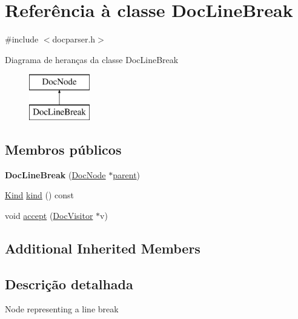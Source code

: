 \hypertarget{class_doc_line_break}{\section{Referência à classe Doc\-Line\-Break}
\label{class_doc_line_break}
}


{\ttfamily \#include $<$docparser.\-h$>$}

Diagrama de heranças da classe Doc\-Line\-Break\begin{figure}[H]
\begin{center}
\leavevmode
\includegraphics[height=2.000000cm]{class_doc_line_break}
\end{center}
\end{figure}
\subsection*{Membros públicos}
\begin{DoxyCompactItemize}
\item 
\hypertarget{class_doc_line_break_a955c43a086a27c23242f3f7e1b359037}{{\bfseries Doc\-Line\-Break} (\hyperlink{class_doc_node}{Doc\-Node} $\ast$\hyperlink{class_doc_node_abd7f070d6b0a38b4da71c2806578d19d}{parent})}\label{class_doc_line_break_a955c43a086a27c23242f3f7e1b359037}

\item 
\hyperlink{class_doc_node_aa10c9e8951b8ccf714a59ec321bdac5b}{Kind} \hyperlink{class_doc_line_break_aa9d037bed9f9a083d0cd01485637d843}{kind} () const 
\item 
void \hyperlink{class_doc_line_break_a7ba716e854ae2f8f87a4eb2140e302b6}{accept} (\hyperlink{class_doc_visitor}{Doc\-Visitor} $\ast$v)
\end{DoxyCompactItemize}
\subsection*{Additional Inherited Members}


\subsection{Descrição detalhada}
Node representing a line break 

